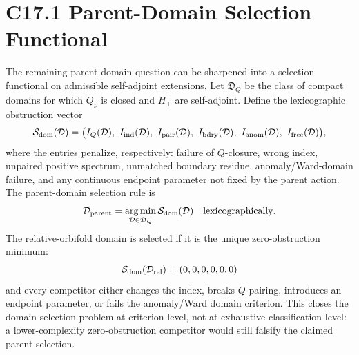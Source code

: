 \documentclass[11pt]{article}
\begin{document}
\section{C17.1 Parent-Domain Selection Functional}
The remaining parent-domain question can be sharpened into a selection
functional on admissible self-adjoint extensions.  Let $\mathfrak D_Q$ be the
class of compact domains for which $Q_\nu$ is closed and $H_\pm$ are
self-adjoint.  Define the lexicographic obstruction vector
\begin{equation}
{\cal S}_{\rm dom}({\cal D})
=
\big(
I_Q({\cal D}),\ I_{\rm ind}({\cal D}),\
I_{\rm pair}({\cal D}),\ I_{\rm bdry}({\cal D}),\
I_{\rm anom}({\cal D}),\ I_{\rm free}({\cal D})
\big),
\end{equation}
where the entries penalize, respectively: failure of $Q$-closure, wrong index,
unpaired positive spectrum, unmatched boundary residue, anomaly/Ward-domain
failure, and any continuous endpoint parameter not fixed by the parent action.
The parent-domain selection rule is
\begin{equation}
{\cal D}_{\rm parent}
=
\operatorname*{arg\,min}_{{\cal D}\in\mathfrak D_Q}
{\cal S}_{\rm dom}({\cal D})
\quad\hbox{lexicographically} .
\end{equation}
The relative-orbifold domain is selected if it is the unique zero-obstruction
minimum:
\begin{equation}
{\cal S}_{\rm dom}({\cal D}_{\rm rel})=(0,0,0,0,0,0)
\end{equation}
and every competitor either changes the index, breaks $Q$-pairing, introduces
an endpoint parameter, or fails the anomaly/Ward domain criterion.  This closes
the domain-selection problem at criterion level, not at exhaustive
classification level: a lower-complexity zero-obstruction competitor would
still falsify the claimed parent selection.
\end{document}
